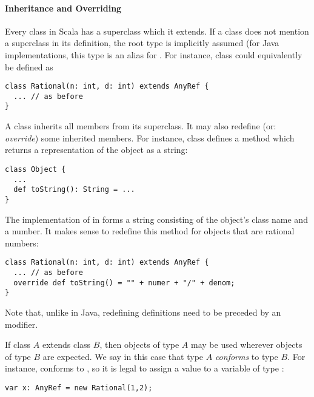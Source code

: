 \paragraph{Inheritance and Overriding}
Every class in Scala has a superclass which it extends.  
If a class
does not mention a superclass in its definition, the root type
 is implicitly assumed (for Java implementations,
this type is an alias for . For instance, class
 could equivalently be defined as
\begin{lstlisting}
class Rational(n: int, d: int) extends AnyRef {
  ... // as before
}
\end{lstlisting}
A class inherits all members from its superclass. It may also redefine
(or: {\em override}) some inherited members. For instance, class
 defines
a method
 which returns a representation of the object as a string:
\begin{lstlisting}
class Object {
  ...
  def toString(): String = ...
}
\end{lstlisting}
The implementation of  in 
forms a string consisting of the object's class name and a number. It
makes sense to redefine this method for objects that are rational
numbers:
\begin{lstlisting}
class Rational(n: int, d: int) extends AnyRef {
  ... // as before
  override def toString() = "" + numer + "/" + denom;
}
\end{lstlisting}
Note that, unlike in Java, redefining definitions need to be preceded
by an  modifier.

If class $A$ extends class $B$, then objects of type $A$ may be used
wherever objects of type $B$ are expected. We say in this case that
type $A$ {\em conforms} to type $B$.  For instance, 
conforms to , so it is legal to assign a 
value to a variable of type :
\begin{lstlisting}
var x: AnyRef = new Rational(1,2);
\end{lstlisting}

